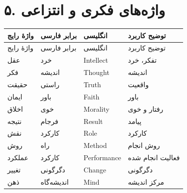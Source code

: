 \documentclass[a4paper,12pt,openany]{book}
\begin{document}
\section*{۵. واژه‌های فکری و انتزاعی}
\begingroup
\small
\setlength{\tabcolsep}{4pt}
\renewcommand{\arraystretch}{1.25}
\begin{longtable}{|p{2.5cm}|p{4.0cm}|p{2.3cm}|p{5.3cm}|}
\hline
واژهٔ رایج & برابر فارسی & انگلیسی & توضیح کاربرد \\
\hline
\endfirsthead
\hline
واژهٔ رایج & برابر فارسی & انگلیسی & توضیح کاربرد \\
\hline
\endhead
عقل & خرد & \textenglish{Intellect} & تفکر، خرد \\
فکر & اندیشه & \textenglish{Thought} & اندیشه \\
حقیقت & راستی & \textenglish{Truth} & واقعیت \\
ایمان & باور & \textenglish{Faith} & باور \\
اخلاق & خوی & \textenglish{Morality} & رفتار و خوی \\
نتیجه & فرجام & \textenglish{Result} & پیامد \\
نقش & کارکرد & \textenglish{Role} & کارکرد \\
روش & راه & \textenglish{Method} & روش انجام \\
عملکرد & کارکرد & \textenglish{Performance} & فعالیت انجام شده \\
تغییر & دگرگونی & \textenglish{Change} & دگرگونی \\
ذهن & اندیشه‌گاه & \textenglish{Mind} & مرکز اندیشه \\
\hline
\end{longtable}
\endgroup
\end{document}
